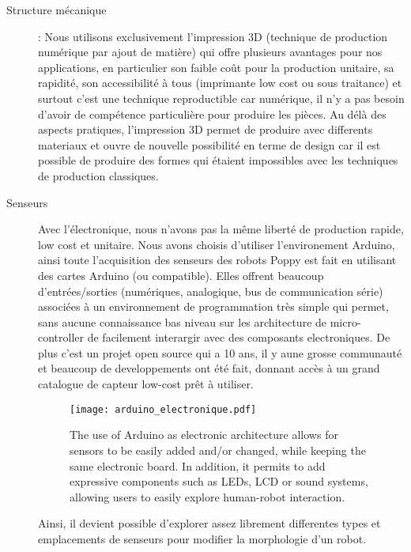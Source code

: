 \begin{description}
  \item[Structure mécanique]: Nous utilisons exclusivement l'impression 3D (technique de production numérique par ajout de matière) qui offre plusieurs avantages pour nos applications, en particulier son faible coût pour la production unitaire, sa rapidité, son accessibilité à tous (imprimante low cost ou sous traitance) et surtout c'est une technique reproductible car numérique, il n'y a pas besoin d'avoir de compétence particulière pour produire les pièces. Au délà des aspects pratiques, l'impression 3D permet de produire avec differents materiaux et ouvre de nouvelle possibilité en terme de design car il est possible de produire des formes qui étaient impossibles avec les techniques de production classiques.

  \item[Senseurs] Avec l'électronique, nous n'avons pas la même liberté de production rapide, low cost et unitaire. Nous avons choisis d'utiliser l'environement Arduino, ainsi toute l'acquisition des senseurs des robots Poppy est fait en utilisant des cartes Arduino (ou compatible). Elles offrent beaucoup d'entrées/sorties (numériques, analogique, bus de communication série) associées à un environnement de programmation très simple qui permet, sans aucune connaissance bas niveau sur les architecture de micro-controller de facilement interargir avec des composants electroniques.
  De plus c'est un projet open source qui a 10 ans, il y aune grosse communauté et beaucoup de developpements ont été fait, donnant accès à un grand catalogue de capteur low-cost prêt à utiliser.

  \begin{figure}[h]
      \begin{center}
          \texttt{[image: arduino\_electronique.pdf]}
      \end{center}
      \caption{The use of Arduino as electronic architecture  allows for sensors to be easily added and/or changed, while keeping the same electronic board. In addition, it permits to add expressive components such as LEDs, LCD or sound systems, allowing users to easily explore human-robot interaction.}
      \label{fig:arduino_modular_electronic}
  \end{figure}

  Ainsi, il devient possible d'explorer assez librement differentes types et emplacements de senseurs pour modifier la morphologie d'un robot.


\end{description}
